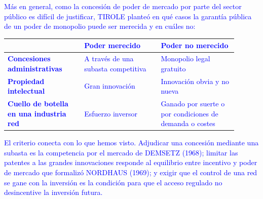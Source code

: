 \documentclass[10pt,a4paper]{article}
\begin{document}
\textcolor{blue}{Más en general, como la concesión de poder de mercado por parte del sector público es difícil de justificar, TIROLE planteó en qué casos la garantía pública de un poder de monopolio puede ser merecida y en cuáles no:
\vspace{1em}
\begin{center}
  \setlength{\tabcolsep}{2pt}
  \begin{tabular}{|p{0.30\linewidth}|p{0.30\linewidth}|p{0.30\linewidth}|}
  \hline
  & \textbf{Poder merecido} & \textbf{Poder no merecido} \\
  \hline
  \textbf{Concesiones administrativas}\footnotemark
  & {\scriptsize A través de una subasta competitiva}
  & {\scriptsize Monopolio legal gratuito} \\
  \hline
  \textbf{Propiedad intelectual}\footnotemark
  & {\scriptsize Gran innovación}
  & {\scriptsize Innovación obvia y no nueva} \\
  \hline
  \textbf{Cuello de botella en una industria red}\footnotemark
  & {\scriptsize Esfuerzo inversor}
  & {\scriptsize Ganado por suerte o por condiciones de demanda o costes} \\
  \hline
\end{tabular}
\end{center}
\addtocounter{footnote}{-2}
\vspace{1em}}

\textcolor{blue}{El criterio conecta con lo que hemos visto. Adjudicar una concesión mediante una subasta es la competencia por el mercado de DEMSETZ (1968); limitar las patentes a las grandes innovaciones responde al equilibrio entre incentivo y poder de mercado que formalizó NORDHAUS (1969); y exigir que el control de una red se gane con la inversión es la condición para que el acceso regulado no desincentive la inversión futura.}
\end{document}
